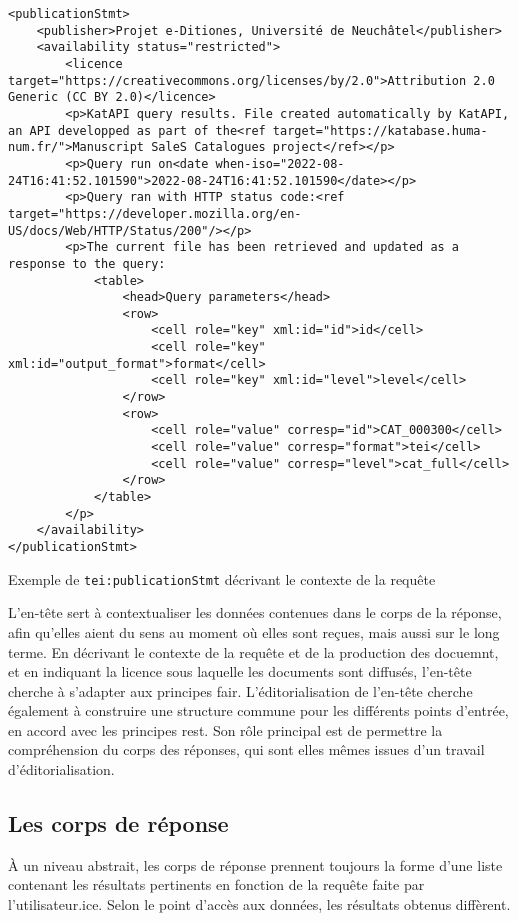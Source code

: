 \begin{listing}[hp!]
	\begin{verbatim}
<publicationStmt>
	<publisher>Projet e-Ditiones, Université de Neuchâtel</publisher>
	<availability status="restricted">
		<licence target="https://creativecommons.org/licenses/by/2.0">Attribution 2.0 Generic (CC BY 2.0)</licence>
		<p>KatAPI query results. File created automatically by KatAPI, an API developped as part of the<ref target="https://katabase.huma-num.fr/">Manuscript SaleS Catalogues project</ref></p>
		<p>Query run on<date when-iso="2022-08-24T16:41:52.101590">2022-08-24T16:41:52.101590</date></p>
		<p>Query ran with HTTP status code:<ref target="https://developer.mozilla.org/en-US/docs/Web/HTTP/Status/200"/></p>
		<p>The current file has been retrieved and updated as a response to the query:
			<table>
				<head>Query parameters</head>
				<row>
					<cell role="key" xml:id="id">id</cell>
					<cell role="key" xml:id="output_format">format</cell>
					<cell role="key" xml:id="level">level</cell>
				</row>
				<row>
					<cell role="value" corresp="id">CAT_000300</cell>
					<cell role="value" corresp="format">tei</cell>
					<cell role="value" corresp="level">cat_full</cell>
				</row>
			</table>
		</p>
	</availability>
</publicationStmt>
	\end{verbatim}
	\caption{Exemple de \texttt{tei:publicationStmt} décrivant le contexte de la requête}
	\label{code:api_header_context_tei}
\end{listing}

L'en-tête sert à contextualiser les données contenues dans le corps de la réponse, afin qu'elles aient du sens au moment où elles sont reçues, mais aussi sur le long terme. En décrivant le contexte de la requête et de la production des docuemnt, et en indiquant la licence sous laquelle les documents sont diffusés, l'en-tête cherche à s'adapter aux principes \gls{fair}. L'éditorialisation de l'en-tête cherche également à construire une structure commune pour les différents points d'entrée, en accord avec les principes \gls{rest}. Son rôle principal est de permettre la compréhension du corps des réponses, qui sont elles mêmes issues d'un travail d'éditorialisation.

\subsection{Les corps de réponse}
À un niveau abstrait, les corps de réponse prennent toujours la forme d'une liste contenant les résultats pertinents en fonction de la requête faite par l'utilisateur.ice. Selon le point d'accès aux données, les résultats obtenus diffèrent.

